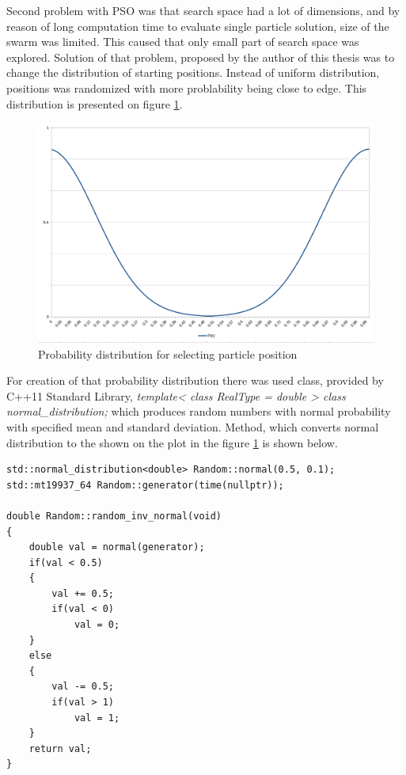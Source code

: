Second problem with PSO was that search space had a lot of dimensions, and by reason of long computation time to evaluate single particle solution, 
size of the swarm was limited. This caused that only small part of search space was explored. Solution of that problem, 
proposed by the author of this thesis was to change the distribution of starting positions. Instead of uniform distribution, positions was randomized 
with more problability being close to edge. This distribution is presented on figure \ref{img_pso_imp_dist}.

\begin{figure}[ht]
	\centering
	\includegraphics[scale=0.4]{img/pso_dist.png}
	\caption{Probability distribution for selecting particle position}
	\label{img_pso_imp_dist}
\end{figure}

For creation of that probability distribution there was used class, provided by C++11 Standard Library, 
\textit{template< class RealType = double > class normal\_distribution;} which produces random numbers with normal probability
with specified mean and standard deviation. Method, which converts normal distribution to the shown on the plot in the figure \ref{img_pso_imp_dist} 
is shown below.

\begin{lstlisting}
std::normal_distribution<double> Random::normal(0.5, 0.1);
std::mt19937_64 Random::generator(time(nullptr));

double Random::random_inv_normal(void)
{
    double val = normal(generator);
    if(val < 0.5)
    {
        val += 0.5;
        if(val < 0)
            val = 0;
    }
    else
    {
        val -= 0.5;
        if(val > 1)
            val = 1;
    }
    return val;
}
\end{lstlisting}
